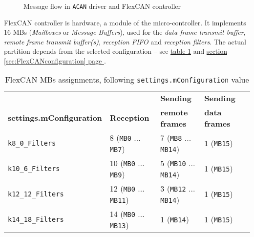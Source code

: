\documentclass[10pt, a4paper, obeyspaces, openany]{extarticle}
\newcommand\refSectionPage[1]{\hyperref[sec:#1]{section \ref*{sec:#1} page \pageref{sec:#1}}}
\newcommand\labelTableau[1]{\label{tab:#1}}
\newcommand\refTableau[1]{\hyperref[tab:#1]{table \ref*{tab:#1}}}
\newcommand\labelFigure[1]{\label{fig:#1}}
\begin{document}
\begin{figure}[!ht]
  \caption{Message flow in \texttt{ACAN} driver and FlexCAN controller}
  \labelFigure{figureStructureStationCAN}
\end{figure}

FlexCAN controller is hardware, a module of the micro-controller. It implements 16 MBs (\emph{Mailboxes} or \emph{Message Buffers}), used for the \emph{data frame transmit buffer}, \emph{remote frame transmit buffer(s)}, \emph{reception FIFO} and \emph{reception filters}. The actual partition depends from the selected configuration -- see \refTableau{MBassignement} and \refSectionPage{FlexCANconfiguration}.



\begin{table}[!ht]
  \small
  \onehalfspacing
  \centering
  \begin{tabular}{lllll}
     & & \textbf{Sending} & \textbf{Sending} \\
    \textbf{settings.mConfiguration}& \textbf{Reception} & \textbf{remote frames} & \textbf{data frames} \\
    \texttt{k8\_0\_Filters} & 8 (\texttt{MB0} ... \texttt{MB7}) & 7 (\texttt{MB8} ... \texttt{MB14}) & 1 (\texttt{MB15})\\
    \texttt{k10\_6\_Filters} & 10  (\texttt{MB0} ... \texttt{MB9}) & 5  (\texttt{MB10} ... \texttt{MB14})& 1 (\texttt{MB15})\\
    \texttt{k12\_12\_Filters} & 12  (\texttt{MB0} ... \texttt{MB11}) & 3  (\texttt{MB12} ... \texttt{MB14}) & 1 (\texttt{MB15})\\
    \texttt{k14\_18\_Filters} & 14  (\texttt{MB0} ... \texttt{MB13}) & 1 (\texttt{MB14}) & 1 (\texttt{MB15})\\
  \end{tabular}
  \caption{FlexCAN MBs assignments, following \texttt{settings.mConfiguration} value}
  \labelTableau{MBassignement}
\end{table}
\end{document}
